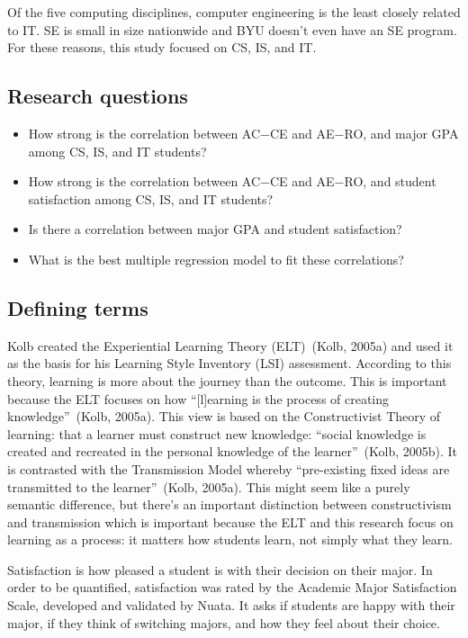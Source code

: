 Of the five computing disciplines, computer engineering is the least closely related to IT. SE is small in size nationwide and BYU doesn't even have an SE program. For these reasons, this study focused on CS, IS, and IT.

\subsection{Research questions}
\begin{itemize}
  \item How strong is the correlation between AC$-$CE and AE$-$RO, and major GPA among CS, IS, and IT students?
  \item How strong is the correlation between AC$-$CE and AE$-$RO, and student satisfaction among CS, IS, and IT students?
  \item Is there a correlation between major GPA and student satisfaction?
  \item What is the best multiple regression model to fit these correlations?
\end{itemize}

\subsection{Defining terms}
Kolb created the Experiential Learning Theory (ELT)~(Kolb, 2005a) and used it as the basis for his Learning Style Inventory (LSI) assessment. According to this theory, learning is more about the journey than the outcome. This is important because the ELT focuses on how ``[l]earning is the process of creating knowledge''~(Kolb, 2005a). This view is based on the Constructivist Theory of learning: that a learner must construct new knowledge: ``social knowledge is created and recreated in the personal knowledge of the learner''~(Kolb, 2005b). It is contrasted with the Transmission Model whereby ``pre-existing fixed ideas are transmitted to the learner''~(Kolb, 2005a). This might seem like a purely semantic difference, but there's an important distinction between constructivism and transmission which is important because the ELT and this research focus on learning as a process: it matters how students learn, not simply what they learn.

Satisfaction is how pleased a student is with their decision on their major. In order to be quantified, satisfaction was rated by the Academic Major Satisfaction Scale, developed and validated by Nuata. It asks if students are happy with their major, if they think of switching majors, and how they feel about their choice.

